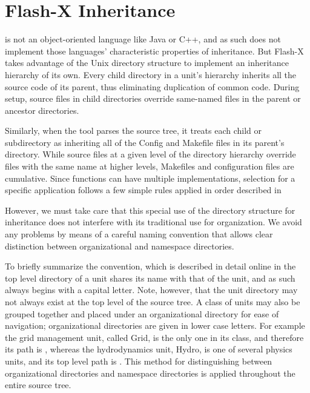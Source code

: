 \section{Flash-X Inheritance}
\label{Sec:Inheritance}

\newcommand{\OS}{Unix\xspace}
 is not an object-oriented language like Java or C++, and as such does not implement
those languages' characteristic properties of inheritance.  But Flash-X takes advantage of
the \OS directory structure to implement an inheritance hierarchy of its own. Every child
directory in a unit's hierarchy inherits all the source code of its parent, thus eliminating
duplication of common code. During setup, source files in child directories override same-named files in
the parent or ancestor directories.  

Similarly, when the
 tool parses the source tree, it treats each 
child or subdirectory 
as inheriting all of the Config and Makefile files 
in its parent's directory. While source files at a given level of
the directory hierarchy override files with the same name at higher
levels, Makefiles and configuration files are
cumulative. 
Since functions can have multiple implementations,
selection for a specific application  follows a few simple rules
applied in order described in %

However, we must take care that this special use of the directory structure for inheritance
does not interfere with its traditional use for organization. We avoid any problems by means
of a careful naming convention that allows clear distinction between organizational and
namespace directories. 

To briefly summarize the convention, which is described in detail
online in %
the
top level directory of a unit shares its name with that of the unit, and as such always begins with a
capital letter. Note, however, that the unit directory may not always exist at the top level of the source
tree. A class of units may also be grouped together
and placed under an organizational directory for ease of navigation; 
organizational directories are given in lower case letters.
For example the grid management
unit, called \unit{Grid}, is the only one in its class,
and therefore its path is , whereas the hydrodynamics unit, \unit{Hydro}, is one of
several physics units, and its top level path is . This method for
distinguishing between organizational directories and namespace directories is applied
throughout the entire source tree.



